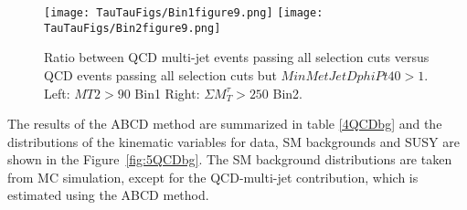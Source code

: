 \begin{figure}[htbp]
\centering
\texttt{[image: TauTauFigs/Bin1figure9.png]}
\texttt{[image: TauTauFigs/Bin2figure9.png]} \\
\caption{ Ratio between QCD multi-jet events passing all selection cuts versus QCD events
 passing all selection cuts but $MinMetJetDphiPt40>1$. Left:  $MT2>90$ Bin1   Right:  $\Sigma M_{T}^{\tau} >250$ Bin2.}
\label{fig:3QCDbg}
\end{figure}




The results of the ABCD method are summarized in table \ref{4QCDbg} and the distributions of the kinematic variables  for data, SM backgrounds and SUSY are shown in the Figure~\ref{fig:5QCDbg}. The SM background distributions
are taken from MC simulation, except for the QCD-multi-jet contribution, which is estimated
using the ABCD method.



